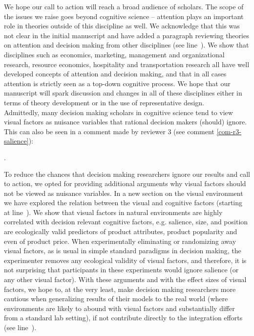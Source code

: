 We hope our call to action will reach a broad audience of scholars. The scope of the issues we raise goes beyond cognitive science -- attention plays an important role in theories outside of this discipline as well. We acknowledge that this was not clear in the initial manuscript and have added a paragraph reviewing theories on attention and decision making from other disciplines (see line~). We show that disciplines such as economics, marketing, management and organizational research, resource economics, hospitality and transportation research all have well developed concepts of attention and decision making, and that in all cases attention is strictly seen as a top-down cognitive process. We hope that our manuscript will spark discussion and changes in all of these disciplines either in terms of theory development or in the use of representative design.\\

Admittedly, many decision making scholars in cognitive science tend to view visual factors as nuisance variables that rational decision makers (should) ignore. This can also be seen in a comment made by reviewer 3 (see comment \ref{com-r3-salience}): 

. 

To reduce the chances that decision making researchers ignore our results and call to action, we opted for providing additional arguments why visual factors should not be viewed as nuisance variables. In a new section on the visual environment we have explored the relation between the visual and cognitive factors (starting at line~). We show that visual factors in natural environments are highly correlated with decision relevant cognitive factors, e.g. salience, size, and position are ecologically valid predictors of product attributes, product popularity and even of product price. When experimentally eliminating or randomizing away visual factors, as is usual in simple standard paradigms in decision making, the experimenter removes any ecological validity of visual factors, and therefore, it is not surprising that participants in these experiments would ignore salience (or any other visual factor). With these arguments and with the effect sizes of visual factors, we hope to, at the very least, make decision making researchers more cautious when generalizing results of their models to the real world (where environments are likely to abound with visual factors and substantially differ from a standard lab setting), if not contribute directly to the integration efforts (see  line~).


